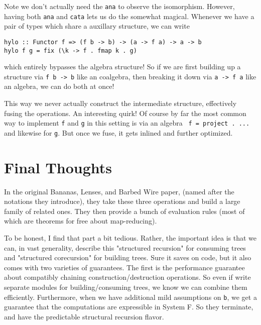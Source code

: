 \documentclass[12pt]{article}
\newcommand{\hask}{\texttt}
\begin{document}
Note we don't actually need the \hask{ana} to observe the isomorphism.
However, having both \hask{ana} and \hask{cata} lets us do the somewhat magical.
Whenever we have a pair of types which share a auxillary structure, we can write
\begin{verbatim}
hylo :: Functor f => (f b -> b) -> (a -> f a) -> a -> b
hylo f g = fix (\k -> f . fmap k . g)
\end{verbatim}
which entirely bypasses the algebra structure!
So if we are first building up a structure via \hask{f b -> b} like an coalgebra, then breaking it down via \hask{a -> f a} like an algebra, we can do both at once!

This way we never actually construct the intermediate structure, effectively fusing the operations. An interesting quirk! 
Of course by far the most common way to implement \hask{f} and \hask{g} in this setting is via an algebra \hask{ f = project . \case ...} and likewise for \hask{g}.
But once we fuse, it gets inlined and further optimized.

\section{Final Thoughts}
In the original Bananas, Lenses, and Barbed Wire paper, (named after the notations they introduce), they take these three operations and build a large family of related ones. They then provide a bunch of evaluation rules (most of which are theorems for free about map-reducing). 

To be honest, I find that part a bit tedious.
Rather, the important idea is that we can, in vast generality, describe this "structured recursion" for consuming trees and "structured corecursion" for building trees. Sure it saves on code, but it also comes with two varieties of guarantees.
The first is the performance guarantee about compatibly chaining construction/destruction operations.
So even if write separate modules for building/consuming trees, we know we can combine them efficiently.
Furthermore, when we have additional mild assumptions on \hask{b}, we get a guarantee that the computations are expressible in System F.
So they terminate, and have the predictable structural recursion flavor.
\end{document}
